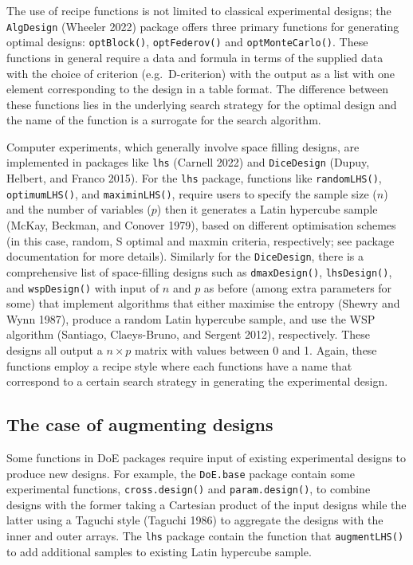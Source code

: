 \documentclass{article}
\begin{document}
The use of recipe functions is not limited to classical experimental
designs; the \texttt{AlgDesign} (Wheeler 2022) package offers three
primary functions for generating optimal designs: \texttt{optBlock()},
\texttt{optFederov()} and \texttt{optMonteCarlo()}. These functions in
general require a data and formula in terms of the supplied data with
the choice of criterion (e.g.~D-criterion) with the output as a list
with one element corresponding to the design in a table format. The
difference between these functions lies in the underlying search
strategy for the optimal design and the name of the function is a
surrogate for the search algorithm.

Computer experiments, which generally involve space filling designs, are
implemented in packages like \texttt{lhs} (Carnell 2022) and
\texttt{DiceDesign} (Dupuy, Helbert, and Franco 2015). For the
\texttt{lhs} package, functions like \texttt{randomLHS()},
\texttt{optimumLHS()}, and \texttt{maximinLHS()}, require users to
specify the sample size (\(n\)) and the number of variables (\(p\)) then
it generates a Latin hypercube sample (McKay, Beckman, and Conover
1979), based on different optimisation schemes (in this case, random, S
optimal and maxmin criteria, respectively; see package documentation for
more details). Similarly for the \texttt{DiceDesign}, there is a
comprehensive list of space-filling designs such as
\texttt{dmaxDesign()}, \texttt{lhsDesign()}, and \texttt{wspDesign()}
with input of \(n\) and \(p\) as before (among extra parameters for
some) that implement algorithms that either maximise the entropy (Shewry
and Wynn 1987), produce a random Latin hypercube sample, and use the WSP
algorithm (Santiago, Claeys-Bruno, and Sergent 2012), respectively.
These designs all output a \(n \times p\) matrix with values between 0
and 1. Again, these functions employ a recipe style where each functions
have a name that correspond to a certain search strategy in generating
the experimental design.

\hypertarget{the-case-of-augmenting-designs}{%
\subsection{The case of augmenting
designs}\label{the-case-of-augmenting-designs}}

Some functions in DoE packages require input of existing experimental
designs to produce new designs. For example, the \texttt{DoE.base}
package contain some experimental functions, \texttt{cross.design()} and
\texttt{param.design()}, to combine designs with the former taking a
Cartesian product of the input designs while the latter using a Taguchi
style (Taguchi 1986) to aggregate the designs with the inner and outer
arrays. The \texttt{lhs} package contain the function that
\texttt{augmentLHS()} to add additional samples to existing Latin
hypercube sample.
\end{document}
